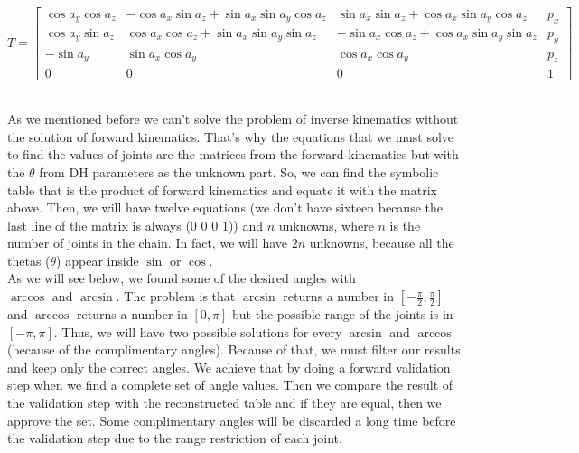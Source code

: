 \begin{scriptsize}
\[
T = 
\begin{bmatrix}
\cos a_y\cos a_z & -\cos a_x\sin a_z + \sin a_x\sin a_y\cos a_z & \sin a_x\sin a_z + \cos a_x\sin a_y\cos a_z & p_x\\
\cos a_y\sin a_z & \cos a_x\cos a_z + \sin a_x\sin a_y\sin a_z & -\sin a_x\cos a_z + \cos a_x\sin a_y\sin a_z & p_y\\
-\sin a_y & \sin a_x\cos a_y & \cos a_x\cos a_y & p_z\\
0 & 0 & 0 & 1
\end{bmatrix}
\]
\end{scriptsize}\\
As we mentioned before we can't solve the problem of inverse kinematics without the solution of forward kinematics. That's why the equations that we must solve to find the values of joints are the matrices from the forward kinematics but with the \(\theta\) from DH parameters as the unknown part. So, we can find the symbolic table that is the product of forward kinematics and equate it with the matrix above. Then, we will have twelve equations (we don't have sixteen because the last line of the matrix is always (\(0\) \(0\) \(0\) \(1\))) and \(n\) unknowns, where \(n\) is the number of joints in the chain. In fact, we will have \(2n\) unknowns, because all the thetas (\(\theta\)) appear inside \(\sin\) or \(\cos\).\\
As we will see below, we found some of the desired angles with \(\arccos \text{ and }\arcsin\). The problem is that \(\arcsin\) returns a number in \(\left[-\tfrac{\pi}{2},\tfrac{\pi}{2}\right]\) and \(\arccos\) returns a number in \(\left[0,\pi\right]\) but the possible range of the joints is in \(\left[-\pi,\pi\right]\). Thus, we will have two possible solutions for every \(\arcsin\) and \(\arccos\) (because of the complimentary angles). Because of that, we must filter our results and keep only the correct angles. We achieve that by doing a forward validation step when we find a complete set of angle values. Then we compare the result of the validation step with the reconstructed table and if they are equal, then we approve the set. Some complimentary angles will be discarded a long time before the validation step due to the range restriction of each joint.

